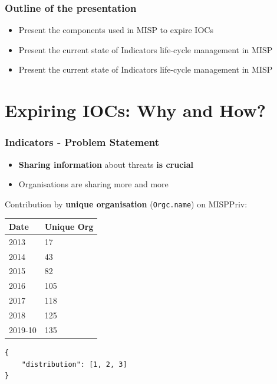 
\begin{frame}[t,plain]
\titlepage
\end{frame}

\begin{frame}
    \frametitle{Outline of the presentation}
    \begin{itemize}
        \item Present the components used in MISP to expire IOCs
        \item Present the current state of Indicators life-cycle management in MISP
        \item Present the current state of Indicators life-cycle management in MISP
    \end{itemize}
\end{frame}

\section{Expiring IOCs: Why and How?}
\begin{frame}[fragile]
\frametitle{Indicators - Problem Statement}
    \begin{itemize}
        \item {\bf Sharing information} about threats {\bf is crucial}
        \item Organisations are sharing more and more
    \end{itemize}
    \vspace{1em}

    Contribution by {\bf unique organisation} (\texttt{Orgc.name}) on MISPPriv:\\
    \vspace{1em}
    \begin{minipage}{0.45\textwidth}
        \begin{tabular}{ll}
            \hline
            Date  & Unique Org \\
            \hline
            2013  & 17 \\
            2014  & 43 \\
            2015  & 82 \\
            2016  & 105 \\
            2017  & 118 \\
            2018  & 125 \\
            2019-10 & 135 \\
            \hline
        \end{tabular}
        \vspace{0.5em}
    \end{minipage}
    \begin{minipage}{0.5\textwidth}
        \begin{lstlisting}
{
    "distribution": [1, 2, 3]
}\end{lstlisting}
    \end{minipage}

\end{frame}

